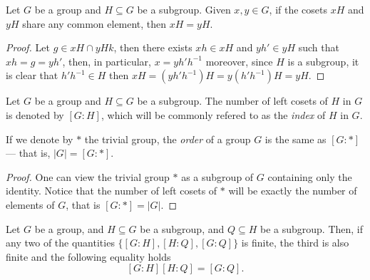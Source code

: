 \begin{corollary}
\label{cor:equal-cosets}
Let \(G\) be a group and \(H \subseteq G\) be a subgroup. Given \(x, y \in G\),
if the cosets \(x H\) and \(y H\) share any common element, then \(x H = y H\).
\end{corollary}

\begin{proof}
Let \(g \in xH \cap yHk\), then there exists \(x h \in xH\) and \(y h' \in yH\)
such that \(x h = g = y h'\), then, in particular, \(x = y h' h^{-1}\) moreover,
since \(H\) is a subgroup, it is clear that \(h' h^{-1} \in H\) then \(x H = (y
h' h^{-1})H = y(h' h^{-1})H = y H\).
\end{proof}

\begin{definition}[Index]
\label{def:grp-index}
Let \(G\) be a group and \(H \subseteq G\) be a subgroup. The number of left
cosets of \(H\) in \(G\) is denoted by \([G : H]\), which will be commonly
refered to as the \emph{index} of \(H\) in \(G\).
\end{definition}

\begin{corollary}
\label{cor:order-as-index}
If we denote by \(*\) the trivial group, the \emph{order} of a group
\(G\) is the same as \([G : *]\) --- that is, \(|G| = [G : *]\).
\end{corollary}

\begin{proof}
One can view the trivial group \(*\) as a subgroup of \(G\) containing only the
identity. Notice that the number of left cosets of \(*\) will be exactly the
number of elements of \(G\), that is \([G : *] = |G|\).
\end{proof}

\begin{proposition}
\label{prop:grp-index-subgroup}
Let \(G\) be a group, and \(H \subseteq G\) be a subgroup, and \(Q \subseteq H\)
be a subgroup. Then, if any two of the quantities \(\{[G : H], [H : Q], [G :
Q]\}\) is finite, the third is also finite and the following equality holds
\[
  [G : H] [H : Q] = [G : Q].
\]
\end{proposition}

